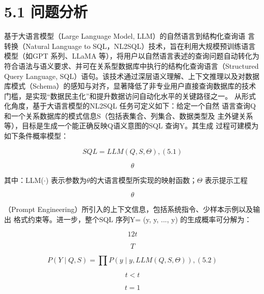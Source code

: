 \documentclass[12pt,a4paper,openright,UTF8]{ctexbook}
\begin{document}
\section{5.1 问题分析}

基于大语言模型（Large Language Model, LLM）的自然语言到结构化查询语 言转换（Natural Language to SQL，NL2SQL）技术，旨在利用大规模预训练语言 模型（如GPT 系列、LLaMA 等），将用户以自然语言表述的查询问题自动转化为 符合语法与语义要求、并可在关系型数据库中执行的结构化查询语言（Structured Query Language, SQL）语句。该技术通过深层语义理解、上下文推理以及对数据 库模式（Schema）的感知与对齐，显著降低了非专业用户直接查询数据库的技术 门槛，是实现“数据民主化”和提升数据访问自动化水平的关键路径之一。 从形式化角度，基于大语言模型的NL2SQL 任务可定义如下：给定一个自然 语言查询Q和一个关系数据库的模式信息S（包括表集合、列集合、数据类型及 主外键关系等），目标是生成一个能正确反映Q语义意图的SQL 查询Y。其生成 过程可建模为如下条件概率模型：

\begin{equation*}
SQL = LLM(Q, S, \Theta),(5.1)
\end{equation*}

\begin{equation*}
\theta
\end{equation*}

其中：LLM($\cdot$) 表示参数为$\theta$的大语言模型所实现的映射函数；$\Theta$ 表示提示工程

\begin{equation*}
\theta
\end{equation*}

（Prompt Engineering）所引入的上下文信息，包括系统指令、少样本示例以及输出 格式约束等。进一步，整个SQL 序列Y= (y, y, ..., y) 的生成概率可分解为：

\begin{equation*}
12t
\end{equation*}

\begin{equation*}
T
\end{equation*}

\begin{equation*}
P(Y\mid Q, S) =\prod P(y\mid y, LLM(Q, S, \Theta)),(5.2)
\end{equation*}

\begin{equation*}
t<t
\end{equation*}

\begin{equation*}
t=1
\end{equation*}
\end{document}
